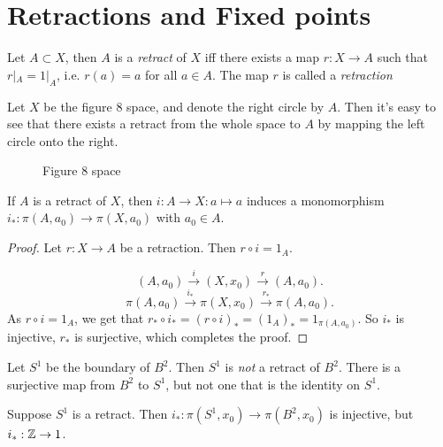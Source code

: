 
\setcounter{section}{54}
\section{Retractions and Fixed points}

\begin{definition}
    Let $A \subset X$, then $A$ is a \emph{retract} of $X$ iff there exists a map $r : X \to A$ such that $r|_A = 1|_A$, i.e.  $r(a) = a$ for all $a \in A$.
    The map $r$ is called a \emph{retraction}
\end{definition}
\begin{eg}
    Let $X$ be the figure $8$ space, and denote the right circle by $A$.
    Then it's easy to see that there exists a retract from the whole space to $A$ by mapping the left circle onto the right.
    \begin{figure}[H]
        \centering
        \caption{Figure 8 space}
        \label{fig:figure-8-space}
    \end{figure}
\end{eg}


\begin{lemma}[55.1]
    If $A$ is a retract of $X$, then $i: A \to X: a \mapsto a$ induces a monomorphism $i_*: \pi(A, a_0) \to \pi(X, a_0)$ with $a_0 \in A$.
\end{lemma}
\begin{proof}
    Let $r: X \to A$ be a retraction. Then $r \circ i = 1_A$.

    \[
        (A, a_0) \xrightarrow{i}  (X, x_0) \xrightarrow{r}  (A, a_0)
    .\] 
    \[
        \pi(A, a_0) \xrightarrow{i_*}  \pi(X, x_0) \xrightarrow{r_*}  \pi(A, a_0)
    .\] 
    As $r  \circ  i = 1_A$, we get that $r_*  \circ  i_* = (r  \circ  i)_* = (1_A)_* = 1_{\pi(A, a_0)}$.
    So $i_*$ is injective, $r_*$ is surjective, which completes the proof.
\end{proof}
\begin{eg}[Theorem 55.2]
    Let $S^1$ be the boundary of $B^2$.
    Then $S^1$ is \emph{not} a retract of $B^2$.
    There is a surjective map from $B^2$ to $S^1$, but not one that is the identity on $S^1$.
\end{eg}
\begin{explanation}
    Suppose $S^1$ is a retract. Then $i_*:\pi(S^1, x_0) \to \pi(B^2, x_0)$ is injective, but $i_*:\mathbb{Z} \to 1$. \hfill\contra
\end{explanation}

